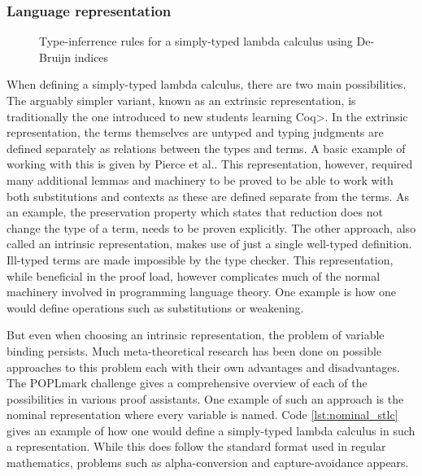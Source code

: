 \subsubsection{Language representation}
\label{sec:language_repr}

\begin{figure}
  \label{fig:stlc_infer}
  \caption{Type-inferrence rules for a simply-typed lambda calculus using De-Bruijn indices}
\end{figure}

When defining a simply-typed lambda calculus, there are two main possibilities\cite{plfa2019}.
The arguably simpler variant, known as an extrinsic representation, is traditionally the one introduced to new students learning \<Coq>.
In the extrinsic representation, the terms themselves are untyped and typing judgments are defined separately as relations between the types and terms.
A basic example of working with this is given by Pierce et al.\cite{Pierce:SF2}.
This representation, however, required many additional lemmas and machinery to be proved to be able to work with both substitutions and contexts as these are defined separate from the terms.
As an example, the preservation property which states that reduction does not change the type of a term, needs to be proven explicitly.
The other approach, also called an intrinsic representation, makes use of just a single well-typed definition.
Ill-typed terms are made impossible by the type checker.
This representation, while beneficial in the proof load, however complicates much of the normal machinery involved in programming language theory.
One example is how one would define operations such as substitutions or weakening.

But even when choosing an intrinsic representation, the problem of variable binding persists.
Much meta-theoretical research has been done on possible approaches to this problem each with their own advantages and disadvantages.
The POPLmark challenge gives a comprehensive overview of each of the possibilities in various proof assistants\cite{Aydemir2005}.
One example of such an approach is the nominal representation where every variable is named.
Code \cref{lst:nominal_stlc} gives an example of how one would define a simply-typed lambda calculus in such a representation.
While this does follow the standard format used in regular mathematics, problems such as alpha-conversion and capture-avoidance appears.

